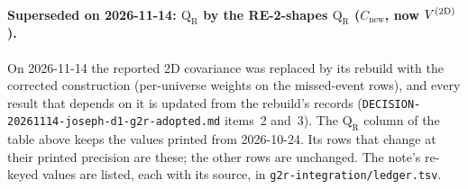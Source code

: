 
\paragraph{Superseded on 2026-11-14: $\mathrm{Q_R}$ by the RE-2-shapes $\mathrm{Q_R}$ ($C_{\mathrm{new}}$, now $V^{(2\mathrm{D})}$).}
\label{app:history-qr-g2r}
On 2026-11-14 the reported 2D covariance was replaced by its rebuild with the corrected construction (per-universe weights on the missed-event rows), and every result that depends on it is updated from the rebuild's records (\texttt{DECISION-20261114-joseph-d1-g2r-adopted.md} items~2 and~3). The $\mathrm{Q_R}$ column of the table above keeps the values printed from 2026-10-24. Its rows that change at their printed precision are these; the other rows are unchanged. The note's re-keyed values are listed, each with its source, in \texttt{g2r-integration/ledger.tsv}.

